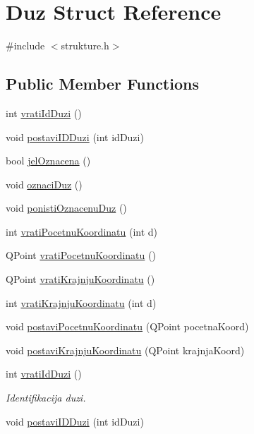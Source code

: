 \hypertarget{struct_duz}{\section{Duz Struct Reference}
\label{struct_duz}
}


{\ttfamily \#include $<$strukture.\-h$>$}

\subsection*{Public Member Functions}
\begin{DoxyCompactItemize}
\item 
int \hyperlink{struct_duz_a554fe11a180cd764811139fd01bf4497}{vrati\-Id\-Duzi} ()
\item 
void \hyperlink{struct_duz_abd5a20344f28f0aa7e1866158eee381e}{postavi\-I\-D\-Duzi} (int id\-Duzi)
\item 
bool \hyperlink{struct_duz_aeefdf37bfc9720b43463bf8bc938e9ec}{jel\-Oznacena} ()
\item 
void \hyperlink{struct_duz_a387f037e652d79a998985a2f9893614a}{oznaci\-Duz} ()
\item 
void \hyperlink{struct_duz_a0c9418b7bb2ae6da48f29622371738ba}{ponisti\-Oznacenu\-Duz} ()
\item 
int \hyperlink{struct_duz_a2662b456f15f42794ddb5c1bfc3f6bb4}{vrati\-Pocetnu\-Koordinatu} (int d)
\item 
Q\-Point \hyperlink{struct_duz_a3110e0ae026af8d6bb2d5de7662e7f8b}{vrati\-Pocetnu\-Koordinatu} ()
\item 
Q\-Point \hyperlink{struct_duz_af397176a5357fecb7f785ad9685d53b2}{vrati\-Krajnju\-Koordinatu} ()
\item 
int \hyperlink{struct_duz_a3729d02c0b3d5b8181b398dc81ec79a4}{vrati\-Krajnju\-Koordinatu} (int d)
\item 
void \hyperlink{struct_duz_a792b22a53508d3c3414bd6eba4903bb3}{postavi\-Pocetnu\-Koordinatu} (Q\-Point pocetna\-Koord)
\item 
void \hyperlink{struct_duz_a6d90841b83d7f5fe8cdd1c5f53b97396}{postavi\-Krajnju\-Koordinatu} (Q\-Point krajnja\-Koord)
\item 
int \hyperlink{struct_duz_a554fe11a180cd764811139fd01bf4497}{vrati\-Id\-Duzi} ()
\begin{DoxyCompactList}\small\item\em Identifikacija duzi. \end{DoxyCompactList}\item 
void \hyperlink{struct_duz_abd5a20344f28f0aa7e1866158eee381e}{postavi\-I\-D\-Duzi} (int id\-Duzi)

\end{DoxyCompactItemize}
